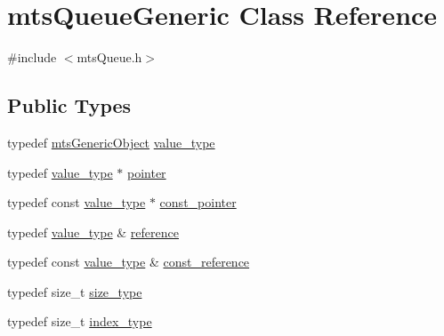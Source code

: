 \hypertarget{classmts_queue_generic}{\section{mts\-Queue\-Generic Class Reference}
\label{classmts_queue_generic}
}


{\ttfamily \#include $<$mts\-Queue.\-h$>$}

\subsection*{Public Types}
\begin{DoxyCompactItemize}
\item 
typedef \hyperlink{classmts_generic_object}{mts\-Generic\-Object} \hyperlink{classmts_queue_generic_ad047c7489c7a195d187714abbff793a9}{value\-\_\-type}
\item 
typedef \hyperlink{classmts_queue_generic_ad047c7489c7a195d187714abbff793a9}{value\-\_\-type} $\ast$ \hyperlink{classmts_queue_generic_aa3ad46661cfdf9f182fd9c32315930a5}{pointer}
\item 
typedef const \hyperlink{classmts_queue_generic_ad047c7489c7a195d187714abbff793a9}{value\-\_\-type} $\ast$ \hyperlink{classmts_queue_generic_a9b295370295fe53fee2f04a2ebd929b8}{const\-\_\-pointer}
\item 
typedef \hyperlink{classmts_queue_generic_ad047c7489c7a195d187714abbff793a9}{value\-\_\-type} \& \hyperlink{classmts_queue_generic_ad4bf20418b4e749013c67b75d4b82aba}{reference}
\item 
typedef const \hyperlink{classmts_queue_generic_ad047c7489c7a195d187714abbff793a9}{value\-\_\-type} \& \hyperlink{classmts_queue_generic_ad133c14265ada42f3347b90ccdd28cd3}{const\-\_\-reference}
\item 
typedef size\-\_\-t \hyperlink{classmts_queue_generic_a3812ba15591f4a89a9df272391739e6f}{size\-\_\-type}
\item 
typedef size\-\_\-t \hyperlink{classmts_queue_generic_a7ff0edcb4cb9771a7085933f2bf022ed}{index\-\_\-type}
\end{DoxyCompactItemize}
